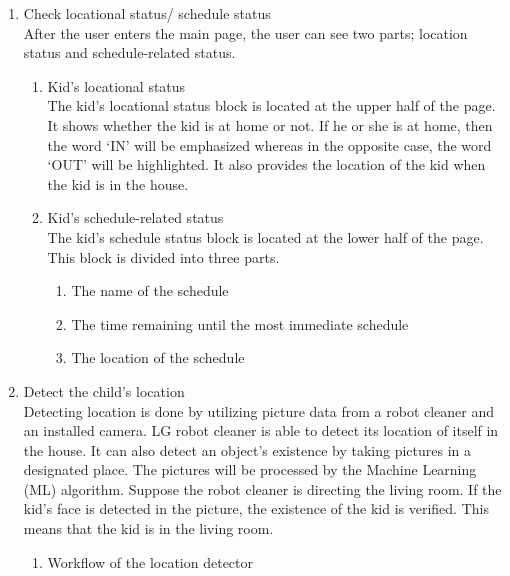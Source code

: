 \documentclass[conference]{IEEEtran}
\begin{document}
\begin{enumerate}[label=\arabic*.]
    \item {\large{Check locational status/ schedule status}} \\
    After the user enters the main page, the user can see two parts; location status and schedule-related status. \\
    \begin{enumerate}[label=\alph*.]
        \item Kid's locational status \\
        The kid’s locational status block is located at the upper half of the page. It shows whether the kid is at home or not. If he or she is at home, then the word ‘IN’ will be emphasized whereas in the opposite case, the word ‘OUT’ will be highlighted. It also provides the location of the kid when the kid is in the house. \\
        \item Kid’s schedule-related status \\
        The kid’s schedule status block is located at the lower half of the page. This block is divided into three parts. \\    
        \begin{enumerate}[label=\roman*.]
            \item The name of the schedule
            \item The time remaining until the most immediate schedule
            \item The location of the schedule \\
        \end{enumerate}      
    \end{enumerate}    
    \item {\large{Detect the child’s location}} \\        
    Detecting location is done by utilizing picture data from a robot cleaner and an installed camera. LG robot cleaner is able to detect its location of itself in the house. It can also detect an object’s existence by taking pictures in a designated place. The pictures will be processed by the Machine Learning (ML) algorithm. Suppose the robot cleaner is directing the living room. If the kid’s face is detected in the picture, the existence of the kid is verified. This means that the kid is in the living room. \\
    \begin{enumerate}[label=\alph*.]
        \item Workflow of the location detector \\

\end{enumerate}
\end{enumerate}
\end{document}
